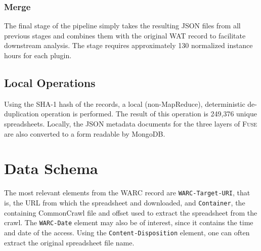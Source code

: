 \documentclass[conference]{IEEEtran}
\begin{document}
\subsubsection{Merge} 

The final stage of the pipeline simply takes the resulting JSON files from all previous stages and combines them with the original WAT record to facilitate downstream analysis. The stage requires approximately 130 normalized instance hours for each plugin.

\subsection{Local Operations}


Using the SHA-1 hash of the records, a local (non-MapReduce), deterministic de-duplication operation is performed. The result of this operation is 249,376 unique spreadsheets. Locally, the JSON metadata documents for the three layers of \textsc{Fuse} are also converted to a form readable by MongoDB.







\section{Data Schema}
\label{sec:schema}


The most relevant elements from the WARC record are \texttt{WARC-Target-URI}, that is, the URL from which the spreadsheet and downloaded, and \texttt{Container}, the containing CommonCrawl file and offset used to extract the spreadsheet from the crawl. The \texttt{WARC-Date} element may also be of interest, since it contains the time and date of the access. Using the \texttt{Content-Disposition} element, one can often extract the original spreadsheet file name.
\end{document}
